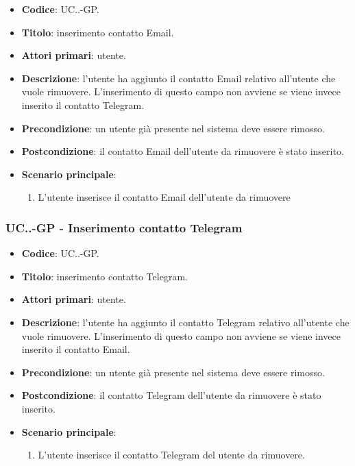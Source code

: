 				\begin{itemize}
					\item \textbf{Codice}: UC\theuccount.\thesubuccount.\thesubsubuccount-GP.
					\item \textbf{Titolo}: inserimento contatto Email.
					\item \textbf{Attori primari}: utente.
					\item \textbf{Descrizione}: l'utente ha aggiunto il contatto Email relativo all'utente che vuole rimuovere. L'inserimento di questo campo non avviene se viene invece inserito il contatto Telegram.
					\item \textbf{Precondizione}: un utente già presente nel sistema deve essere rimosso.
					\item \textbf{Postcondizione}: il contatto Email dell'utente da rimuovere è stato inserito.
					\item \textbf{Scenario principale}:
					\begin{enumerate}
						\item L'utente inserisce il contatto Email dell'utente da rimuovere
					\end{enumerate}
				\end{itemize}

			\subsubsection{UC\theuccount.\thesubuccount.\thesubsubuccount-GP - Inserimento contatto Telegram}

				\begin{itemize}
					\item \textbf{Codice}: UC\theuccount.\thesubuccount.\thesubsubuccount-GP.
					\item \textbf{Titolo}: inserimento contatto Telegram.
					\item \textbf{Attori primari}: utente.
					\item \textbf{Descrizione}: l'utente ha aggiunto il contatto Telegram relativo all'utente che vuole \newline rimuovere. L'inserimento di questo campo non avviene se viene invece inserito il contatto Email.
					\item \textbf{Precondizione}: un utente già presente nel sistema deve essere rimosso.
					\item \textbf{Postcondizione}: il contatto Telegram dell'utente da rimuovere è stato inserito.
					\item \textbf{Scenario principale}:
					\begin{enumerate}
						\item L'utente inserisce il contatto Telegram del utente da rimuovere.
					\end{enumerate}
				\end{itemize}

